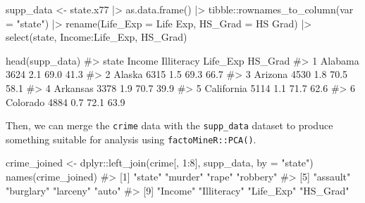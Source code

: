 \documentclass[
  letterpaper,
  10pt,
  krantz2]{krantz}
\makeatletter
\newenvironment{Shaded}{\begin{snugshade}}{\end{snugshade}}
\newcommand{\AttributeTok}[1]{\textcolor[rgb]{0.40,0.45,0.13}{#1}}
\newcommand{\CommentTok}[1]{\textcolor[rgb]{0.37,0.37,0.37}{#1}}
\newcommand{\DecValTok}[1]{\textcolor[rgb]{0.68,0.00,0.00}{#1}}
\newcommand{\FunctionTok}[1]{\textcolor[rgb]{0.28,0.35,0.67}{#1}}
\newcommand{\NormalTok}[1]{\textcolor[rgb]{0.00,0.23,0.31}{#1}}
\newcommand{\OtherTok}[1]{\textcolor[rgb]{0.00,0.23,0.31}{#1}}
\newcommand{\SpecialCharTok}[1]{\textcolor[rgb]{0.37,0.37,0.37}{#1}}
\newcommand{\StringTok}[1]{\textcolor[rgb]{0.13,0.47,0.30}{#1}}
\newenvironment{kframe}{%
  \medskip{}
  \setlength{\fboxsep}{.8em}
  \def\at@end@of@kframe{}%
  \ifinner\ifhmode%
  \def\at@end@of@kframe{\end{minipage}}%
  \begin{minipage}{\columnwidth}%
  \fi\fi%
  \def\FrameCommand##1{\hskip\@totalleftmargin \hskip-\fboxsep
  \colorbox{shadecolor}{##1}\hskip-\fboxsep
      \hskip-\linewidth \hskip-\@totalleftmargin \hskip\columnwidth}%
  \MakeFramed {\advance\hsize-\width
    \@totalleftmargin\z@ \linewidth\hsize
    \@setminipage}}%
{\par\unskip\endMakeFramed%
  \at@end@of@kframe}
\renewenvironment{Shaded}{\begin{kframe}}{\end{kframe}}
\makeatother
\begin{document}
\begin{Shaded}
\begin{Highlighting}[]
\NormalTok{supp\_data }\OtherTok{\textless{}{-}}\NormalTok{ state.x77 }\SpecialCharTok{|\textgreater{}}
  \FunctionTok{as.data.frame}\NormalTok{() }\SpecialCharTok{|\textgreater{}}
\NormalTok{  tibble}\SpecialCharTok{::}\FunctionTok{rownames\_to\_column}\NormalTok{(}\AttributeTok{var =} \StringTok{"state"}\NormalTok{) }\SpecialCharTok{|\textgreater{}}
  \FunctionTok{rename}\NormalTok{(}\AttributeTok{Life\_Exp =} \StringTok{\textasciigrave{}}\AttributeTok{Life Exp}\StringTok{\textasciigrave{}}\NormalTok{,}
         \AttributeTok{HS\_Grad =} \StringTok{\textasciigrave{}}\AttributeTok{HS Grad}\StringTok{\textasciigrave{}}\NormalTok{) }\SpecialCharTok{|\textgreater{}}
  \FunctionTok{select}\NormalTok{(state, Income}\SpecialCharTok{:}\NormalTok{Life\_Exp, HS\_Grad) }

\FunctionTok{head}\NormalTok{(supp\_data)}
\CommentTok{\#\textgreater{}        state Income Illiteracy Life\_Exp HS\_Grad}
\CommentTok{\#\textgreater{} 1    Alabama   3624        2.1     69.0    41.3}
\CommentTok{\#\textgreater{} 2     Alaska   6315        1.5     69.3    66.7}
\CommentTok{\#\textgreater{} 3    Arizona   4530        1.8     70.5    58.1}
\CommentTok{\#\textgreater{} 4   Arkansas   3378        1.9     70.7    39.9}
\CommentTok{\#\textgreater{} 5 California   5114        1.1     71.7    62.6}
\CommentTok{\#\textgreater{} 6   Colorado   4884        0.7     72.1    63.9}
\end{Highlighting}
\end{Shaded}

Then, we can merge the \texttt{crime} data with the \texttt{supp\_data}
dataset to produce something suitable for analysis using
\texttt{factoMineR::PCA()}.

\begin{Shaded}
\begin{Highlighting}[]
\NormalTok{crime\_joined }\OtherTok{\textless{}{-}}
\NormalTok{  dplyr}\SpecialCharTok{::}\FunctionTok{left\_join}\NormalTok{(crime[, }\DecValTok{1}\SpecialCharTok{:}\DecValTok{8}\NormalTok{], supp\_data, }\AttributeTok{by =} \StringTok{"state"}\NormalTok{)}
\FunctionTok{names}\NormalTok{(crime\_joined)}
\CommentTok{\#\textgreater{}  [1] "state"      "murder"     "rape"       "robbery"   }
\CommentTok{\#\textgreater{}  [5] "assault"    "burglary"   "larceny"    "auto"      }
\CommentTok{\#\textgreater{}  [9] "Income"     "Illiteracy" "Life\_Exp"   "HS\_Grad"}
\end{Highlighting}
\end{Shaded}
\end{document}
